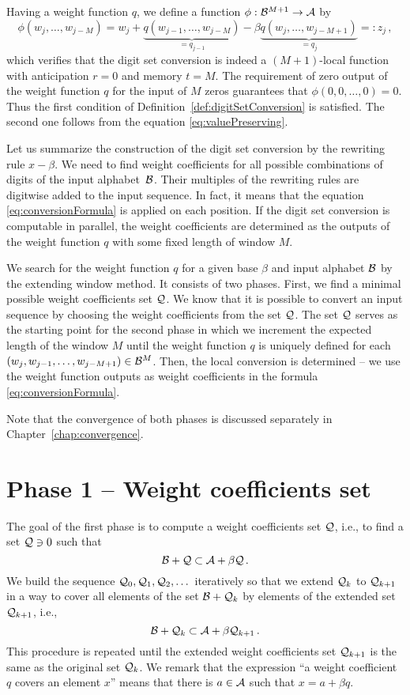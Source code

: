 \begin{upravit}
 Having a weight function $q$, we define a function $\phi:\mathcal{B}^{M+1}\rightarrow \mathcal{A}$ by
    \begin{equation}
    \label{eq:localConversion}
        \phi(w_{j}, \dots, w_{j-M})=w_j+ \underbrace{q(w_{j-1}, \dots, w_{j-M})}_{=q_{j-1}} - \beta \underbrace{q(w_j, \dots, w_{j-M+1})}_{=q_j}=:z_j\,,
    \end{equation} 
    which verifies that the digit set conversion is indeed a $(M+1)$-local function with anticipation $r=0$ and memory $t=M$. The requirement of zero output of the weight function $q$ for the input of $M$ zeros guarantees that $\phi(0,0,\dots,0)=0$. Thus the first condition of Definition~\ref{def:digitSetConversion} is satisfied. The second one follows from the equation \eqref{eq:valuePreserving}. 
    
Let us summarize the construction of the digit set conversion by the rewriting rule \mbox{$x-\beta$}. We need to find weight coefficients for all possible combinations of digits of the input alphabet~$\mathcal{B}$. Their multiples of the rewriting rules are digitwise added to the input sequence. In fact, it means that the equation  \eqref{eq:conversionFormula} is applied on each position. If the digit set conversion is computable in parallel, the weight coefficients are determined as the outputs of the weight function $q$ with some fixed length of window $M$.  

We search for the weight function $q$ for a given base $\beta$ and input alphabet $\mathcal{B}$ by the extending window method. It consists of two phases. First, we find a minimal possible weight coefficients set $\mathcal{Q}$. We know that it is possible to convert an input sequence by choosing the weight coefficients from the set $\mathcal{Q}$. The set $\mathcal{Q}$ serves as the starting point for the second phase in which we increment the expected length of the window $M$ until the weight function $q$ is uniquely defined for each $(w_j,w_{j-1}, \dots , w_{j-M+1}) \in \mathcal{B}^{M}$. Then, the local conversion is determined -- we use the weight function outputs as weight coefficients in the formula \eqref{eq:conversionFormula}.    

Note that the convergence of both phases is discussed separately in Chapter~\ref{chap:convergence}.

\section{Phase 1 -- Weight coefficients set}
\label{subsec:phase1}
The goal of the first phase is to compute a weight coefficients set $\mathcal{Q}$, i.e., to find a set $\mathcal{Q} \ni 0$ such that 
$$
    \mathcal{B} + \mathcal{Q} \subset \mathcal{A} + \beta \mathcal{Q}\,.
$$  
We build the sequence $\mathcal{Q}_0, \mathcal{Q}_1, \mathcal{Q}_2,\dots$ iteratively so that we extend $\mathcal{Q}_k$ to $\mathcal{Q}_{k+1}$ in a way to cover all elements of the set $\mathcal{B}+\mathcal{Q}_k$ by elements of the extended set $\mathcal{Q}_{k+1}$, i.e.,
$$
\mathcal{B}+ \mathcal{Q}_k \subset \mathcal{A} + \beta \mathcal{Q}_{k+1}\,.
$$
This procedure is repeated until the extended weight coefficients set $\mathcal{Q}_{k+1}$ is the same as the original set $\mathcal{Q}_{k}$. We remark that the expression ``a weight coefficient $q$ covers an element $x$'' means that there is $a \in \mathcal{A}$ such that $x=a + \beta q$. 


\end{upravit}
